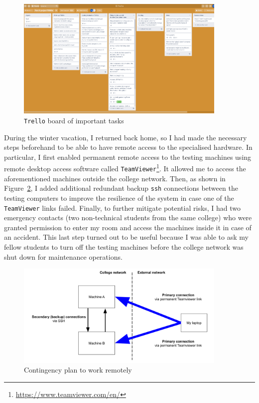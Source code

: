 \documentclass[12pt,a4paper,twoside,openright]{report}
\begin{document}
    \begin{figure}[ht]
    \centering
    \includegraphics[width=0.9\textwidth]{figs/Trello_board.PNG}
    \caption{\texttt{Trello} board of important tasks}
    \label{fig:Trello_board}
    \end{figure}
    
    During the winter vacation, I returned back home, so I had made the necessary steps beforehand to be able to have remote access to the specialised hardware.
    In particular, I first enabled permanent remote access to the testing machines using remote desktop access software called \texttt{TeamViewer}\footnote{\url{https://www.teamviewer.com/en/}}.
    It allowed me to access the aforementioned machines outside the college network.
    Then, as shown in Figure~\ref{fig:setup_map}, I added additional redundant backup \texttt{ssh} connections between the testing computers to improve the resilience of the system in case one of the \texttt{TeamViewer} links failed.
    Finally, to further mitigate potential risks, I had two emergency contacts (two non-technical students from the same college) who were granted permission to enter my room and access the machines inside it in case of an accident.
    This last step turned out to be useful because I was able to ask my fellow students to turn off the testing machines before the college network was shut down for maintenance operations.
    

    \begin{figure}[ht]
    \centering
    \includegraphics[width=0.9\textwidth]{figs/Setup map.png}
    \caption[Contingency plan to work remotely]{Contingency plan to work remotely}
    \label{fig:setup_map}
    \end{figure}
\end{document}
